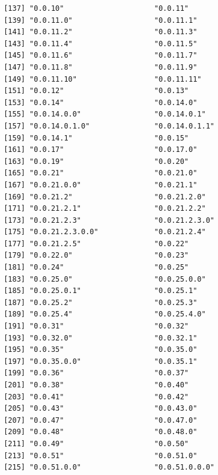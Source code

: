 \documentclass[
  letterpaper,
  DIV=11,
  numbers=noendperiod]{scrreprt}
\begin{document}
\begin{verbatim}
 [137] "0.0.10"                     "0.0.11"                    
 [139] "0.0.11.0"                   "0.0.11.1"                  
 [141] "0.0.11.2"                   "0.0.11.3"                  
 [143] "0.0.11.4"                   "0.0.11.5"                  
 [145] "0.0.11.6"                   "0.0.11.7"                  
 [147] "0.0.11.8"                   "0.0.11.9"                  
 [149] "0.0.11.10"                  "0.0.11.11"                 
 [151] "0.0.12"                     "0.0.13"                    
 [153] "0.0.14"                     "0.0.14.0"                  
 [155] "0.0.14.0.0"                 "0.0.14.0.1"                
 [157] "0.0.14.0.1.0"               "0.0.14.0.1.1"              
 [159] "0.0.14.1"                   "0.0.15"                    
 [161] "0.0.17"                     "0.0.17.0"                  
 [163] "0.0.19"                     "0.0.20"                    
 [165] "0.0.21"                     "0.0.21.0"                  
 [167] "0.0.21.0.0"                 "0.0.21.1"                  
 [169] "0.0.21.2"                   "0.0.21.2.0"                
 [171] "0.0.21.2.1"                 "0.0.21.2.2"                
 [173] "0.0.21.2.3"                 "0.0.21.2.3.0"              
 [175] "0.0.21.2.3.0.0"             "0.0.21.2.4"                
 [177] "0.0.21.2.5"                 "0.0.22"                    
 [179] "0.0.22.0"                   "0.0.23"                    
 [181] "0.0.24"                     "0.0.25"                    
 [183] "0.0.25.0"                   "0.0.25.0.0"                
 [185] "0.0.25.0.1"                 "0.0.25.1"                  
 [187] "0.0.25.2"                   "0.0.25.3"                  
 [189] "0.0.25.4"                   "0.0.25.4.0"                
 [191] "0.0.31"                     "0.0.32"                    
 [193] "0.0.32.0"                   "0.0.32.1"                  
 [195] "0.0.35"                     "0.0.35.0"                  
 [197] "0.0.35.0.0"                 "0.0.35.1"                  
 [199] "0.0.36"                     "0.0.37"                    
 [201] "0.0.38"                     "0.0.40"                    
 [203] "0.0.41"                     "0.0.42"                    
 [205] "0.0.43"                     "0.0.43.0"                  
 [207] "0.0.47"                     "0.0.47.0"                  
 [209] "0.0.48"                     "0.0.48.0"                  
 [211] "0.0.49"                     "0.0.50"                    
 [213] "0.0.51"                     "0.0.51.0"                  
 [215] "0.0.51.0.0"                 "0.0.51.0.0.0"              

\end{verbatim}
\end{document}
